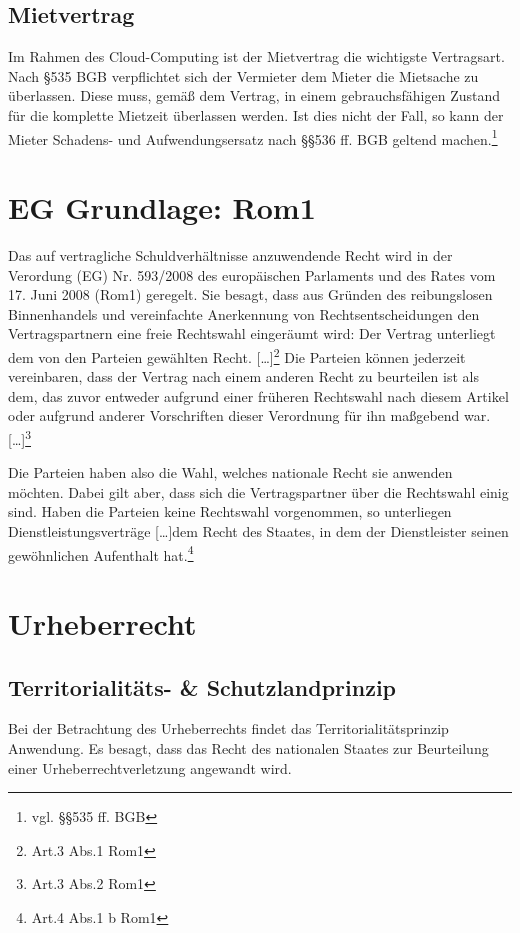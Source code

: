 \subsection{Mietvertrag}
Im Rahmen des Cloud-Computing ist der Mietvertrag die wichtigste Vertragsart.\newline
Nach §535 BGB verpflichtet sich der Vermieter dem Mieter die Mietsache zu \"uberlassen. Diese muss, gem\"a{\ss} dem Vertrag, in einem gebrauchsf\"ahigen Zustand f\"ur die komplette Mietzeit \"uberlassen werden. Ist dies nicht der Fall, so kann der Mieter Schadens- und Aufwendungsersatz nach §§536 ff. BGB geltend machen.\footnote{vgl.  §§535 ff. BGB}
  \label{mietvertrag}

\section{EG Grundlage: Rom1}
Das auf vertragliche Schuldverh\"altnisse anzuwendende Recht wird in der  {\glqq}Verordung (EG) Nr. 593/2008 des europ\"aischen Parlaments und des Rates vom 17. Juni 2008 (Rom1){\grqq} geregelt. Sie besagt, dass aus Gr\"unden des reibungslosen Binnenhandels und vereinfachte Anerkennung von Rechtsentscheidungen den Vertragspartnern eine freie Rechtswahl einger\"aumt wird:{\glqq} Der Vertrag unterliegt dem von den Parteien gew\"ahlten Recht. […]{\grqq}\footnote{Art.3 Abs.1 Rom1}
\newline
{\glqq}Die Parteien k\"onnen jederzeit vereinbaren, dass der Vertrag nach einem anderen Recht zu beurteilen ist als dem, das zuvor entweder aufgrund einer fr\"uheren Rechtswahl nach diesem Artikel oder aufgrund anderer Vorschriften dieser Verordnung f\"ur ihn ma{\ss}gebend war. […]{\grqq}\footnote{Art.3 Abs.2 Rom1}\newline

Die Parteien haben also die Wahl, welches nationale Recht sie anwenden m\"ochten. Dabei gilt aber, dass sich die Vertragspartner \"uber die Rechtswahl einig sind. Haben die Parteien keine Rechtswahl vorgenommen, so unterliegen Dienstleistungsvertr\"age {\glqq}[…]dem Recht des Staates, in dem der Dienstleister seinen gew\"ohnlichen Aufenthalt hat.{\grqq}\footnote{Art.4 Abs.1 b Rom1}

\section{Urheberrecht}
\subsection{Territorialit\"ats- \& Schutzlandprinzip}
Bei der Betrachtung des Urheberrechts findet das Territorialit\"atsprinzip Anwendung. Es besagt, dass das Recht des nationalen Staates zur Beurteilung einer Urheberrechtverletzung angewandt wird.\newline


